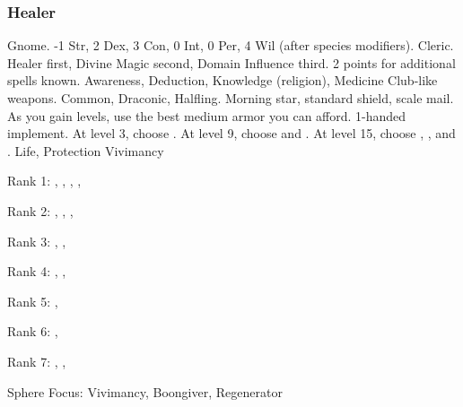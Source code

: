        \subsubsection{Healer}
             Gnome.
             -1 Str, 2 Dex, 3 Con, 0 Int, 0 Per, 4 Wil (after species modifiers).
             Cleric.
             Healer first, Divine Magic second, Domain Influence third.
             2 points for additional spells known.
             Awareness, Deduction, Knowledge (religion), Medicine
             Club-like weapons.
             Common, Draconic, Halfling.
             Morning star, standard shield, scale mail. As you gain levels, use the best medium armor you can afford.
             1-handed implement.
                At level 3, choose .
                At level 9, choose  and .
                At level 15, choose , , and .
             Life, Protection
             Vivimancy
            \begin{raggeditemize}
                \item Rank 1: , , , , 
                \item Rank 2: , , , 
                \item Rank 3: , , 
                \item Rank 4: , , 
                \item Rank 5: , 
                \item Rank 6: , 
                \item Rank 7: , , 
            \end{raggeditemize}
             Sphere Focus: Vivimancy, Boongiver, Regenerator
